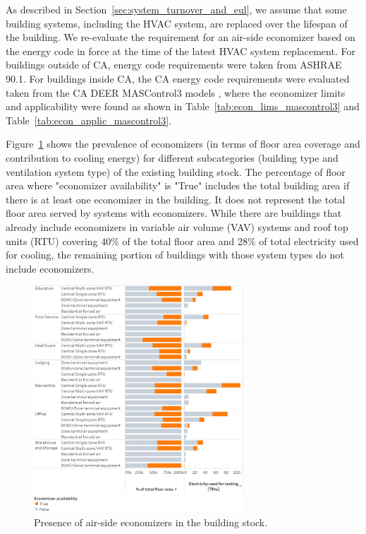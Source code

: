 As described in Section~\ref{sec:system_turnover_and_eul}, we assume that some building systems, including the HVAC system, are replaced over the lifespan of the building. We re-evaluate the requirement for an air-side economizer based on the energy code in force at the time of the latest HVAC system replacement. For buildings outside of CA, energy code requirements were taken from ASHRAE 90.1. For buildings inside CA, the CA energy code requirements were evaluated taken from the CA DEER MASControl3 models \citep{mascontrol3}, where the economizer limits and applicability were found as shown in Table~\ref{tab:econ_lims_mascontrol3} and Table~\ref{tab:econ_applic_mascontrol3}.





Figure~\ref{fig:economizer_presence} shows the prevalence of economizers (in terms of floor area coverage and contribution to cooling energy) for different subcategories (building type and ventilation system type) of the existing building stock. The percentage of floor area where "economizer availability" is "True" includes the total building area if there is at least one economizer in the building. It does not represent the total floor area served by systems with economizers. While there are buildings that already include economizers in variable air volume (VAV) systems and roof top units (RTU) covering 40\% of the total floor area and 28\% of total electricity used for cooling, the remaining portion of buildings with those system types do not include economizers.

\begin{figure}
  \centering \includegraphics[width=0.7\textwidth]{figures/economizer_presence.png}
  \caption{Presence of air-side economizers in the building stock.}
  \label{fig:economizer_presence}
\end{figure}

